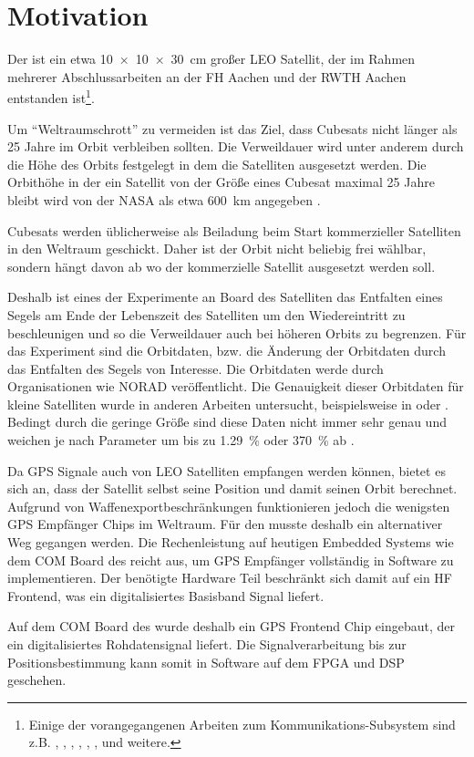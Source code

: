 \section{Motivation}
Der \dscubesat ist ein etwa \SI{10x10x30}{cm} großer \gls{LEO} Satellit, der im Rahmen mehrerer Abschlussarbeiten an der FH Aachen und der RWTH Aachen entstanden ist\footnote{Einige der vorangegangenen Arbeiten zum Kommunikations-Subsystem sind z.B. \cite{DragsailKaiMA}, \cite{DragsailRalfMA}, \cite{DragsailAndrejMA},
\cite{DragsailUweMAGroundDataHandling}, \cite{DragsailVolkerMACommstandard}, \cite{DragsailGeorgMAGroundSDR}, \cite{DragsailNeelamMAGroundDSP} und weitere.}.

Um \enquote{Weltraumschrott} zu vermeiden ist das Ziel, dass Cubesats nicht länger als 25 Jahre im Orbit verbleiben sollten. Die Verweildauer wird unter anderem durch die Höhe des Orbits festgelegt in dem die Satelliten ausgesetzt werden. Die Orbithöhe in der ein  Satellit von der Größe eines Cubesat maximal 25 Jahre bleibt wird von der NASA als etwa \SI{600}{\kilo\meter} angegeben \cite{NASAOrbitalDebris}.

Cubesats werden üblicherweise als Beiladung beim Start kommerzieller Satelliten in den Weltraum geschickt. Daher ist der Orbit nicht beliebig frei wählbar, sondern hängt davon ab wo der kommerzielle Satellit ausgesetzt werden soll.

Deshalb ist eines der Experimente an Board des Satelliten das Entfalten eines Segels am Ende der Lebenszeit des Satelliten um den Wiedereintritt zu beschleunigen und so die Verweildauer auch bei höheren Orbits zu begrenzen. Für das Experiment sind die Orbitdaten, bzw. die Änderung der Orbitdaten durch das Entfalten des Segels von Interesse. Die Orbitdaten werde durch Organisationen wie NORAD veröffentlicht. Die Genauigkeit dieser Orbitdaten für kleine Satelliten wurde in anderen Arbeiten untersucht, beispielsweise in \cite{TLEAccuracyKahr} oder \cite{TLEAccuracyDoyle}. Bedingt durch die geringe Größe sind diese Daten nicht immer sehr genau und weichen je nach Parameter um bis zu \SI{1.29}{\percent} oder \SI{370}{\percent} ab \cite{TLEAccuracyDoyle}.

Da GPS Signale auch von \gls{LEO} Satelliten empfangen werden können, bietet es sich an, dass der Satellit selbst seine Position und damit seinen Orbit berechnet. Aufgrund von Waffenexportbeschränkungen funktionieren jedoch die wenigsten GPS Empfänger Chips im Weltraum. Für den \dscubesat musste deshalb ein alternativer Weg gegangen werden. Die Rechenleistung auf heutigen Embedded Systems wie dem COM Board des \dscubesat reicht aus, um GPS Empfänger vollständig in Software zu implementieren. Der benötigte Hardware Teil beschränkt sich damit auf ein HF Frontend, was ein digitalisiertes Basisband Signal liefert.

Auf dem COM Board des \dscubesat wurde deshalb ein GPS Frontend Chip eingebaut, der ein digitalisiertes Rohdatensignal liefert. Die Signalverarbeitung bis zur Positionsbestimmung kann somit in Software auf dem FPGA und DSP geschehen.